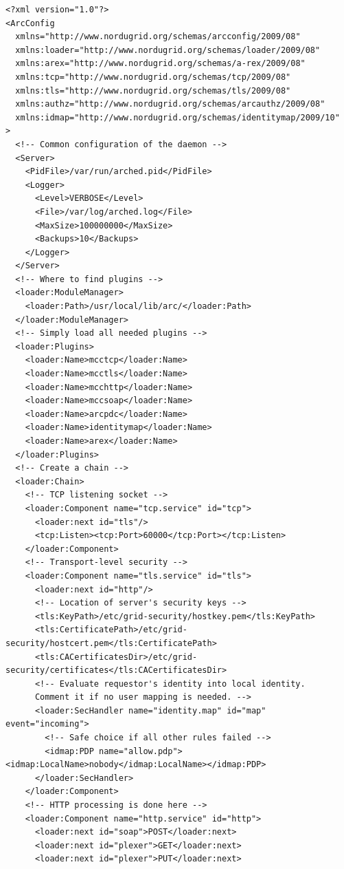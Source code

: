 \documentclass{article}                            %
\begin{document}
\begin{shaded}
\begin{verbatim}
<?xml version="1.0"?>
<ArcConfig
  xmlns="http://www.nordugrid.org/schemas/arcconfig/2009/08"
  xmlns:loader="http://www.nordugrid.org/schemas/loader/2009/08"
  xmlns:arex="http://www.nordugrid.org/schemas/a-rex/2009/08"
  xmlns:tcp="http://www.nordugrid.org/schemas/tcp/2009/08"
  xmlns:tls="http://www.nordugrid.org/schemas/tls/2009/08"
  xmlns:authz="http://www.nordugrid.org/schemas/arcauthz/2009/08"
  xmlns:idmap="http://www.nordugrid.org/schemas/identitymap/2009/10"
>
  <!-- Common configuration of the daemon -->
  <Server>
    <PidFile>/var/run/arched.pid</PidFile>
    <Logger>
      <Level>VERBOSE</Level>
      <File>/var/log/arched.log</File>
      <MaxSize>100000000</MaxSize>
      <Backups>10</Backups>
    </Logger>
  </Server>
  <!-- Where to find plugins -->
  <loader:ModuleManager>
    <loader:Path>/usr/local/lib/arc/</loader:Path>
  </loader:ModuleManager>
  <!-- Simply load all needed plugins -->
  <loader:Plugins>
    <loader:Name>mcctcp</loader:Name>
    <loader:Name>mcctls</loader:Name>
    <loader:Name>mcchttp</loader:Name>
    <loader:Name>mccsoap</loader:Name>
    <loader:Name>arcpdc</loader:Name>
    <loader:Name>identitymap</loader:Name>
    <loader:Name>arex</loader:Name>
  </loader:Plugins>
  <!-- Create a chain -->
  <loader:Chain>
    <!-- TCP listening socket -->
    <loader:Component name="tcp.service" id="tcp">
      <loader:next id="tls"/>
      <tcp:Listen><tcp:Port>60000</tcp:Port></tcp:Listen>
    </loader:Component>
    <!-- Transport-level security -->
    <loader:Component name="tls.service" id="tls">
      <loader:next id="http"/>
      <!-- Location of server's security keys -->
      <tls:KeyPath>/etc/grid-security/hostkey.pem</tls:KeyPath>
      <tls:CertificatePath>/etc/grid-security/hostcert.pem</tls:CertificatePath>
      <tls:CACertificatesDir>/etc/grid-security/certificates</tls:CACertificatesDir>
      <!-- Evaluate requestor's identity into local identity.
      Comment it if no user mapping is needed. -->
      <loader:SecHandler name="identity.map" id="map" event="incoming">
        <!-- Safe choice if all other rules failed -->
        <idmap:PDP name="allow.pdp"><idmap:LocalName>nobody</idmap:LocalName></idmap:PDP>
      </loader:SecHandler>
    </loader:Component>
    <!-- HTTP processing is done here -->
    <loader:Component name="http.service" id="http">
      <loader:next id="soap">POST</loader:next>
      <loader:next id="plexer">GET</loader:next>
      <loader:next id="plexer">PUT</loader:next>

\end{verbatim}
\end{shaded}
\end{document}
